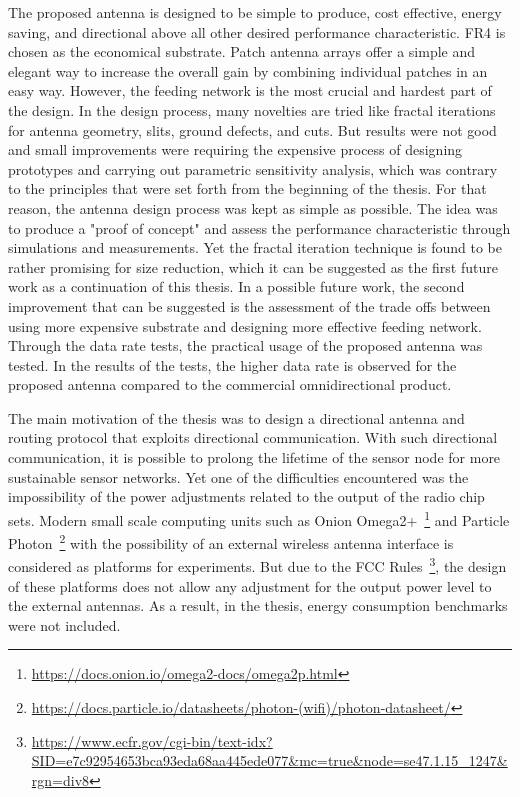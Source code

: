\documentclass[12pt, oneandhalf, chaparabic, sees, ms]{metu}
\begin{document}
The proposed antenna is designed to be simple to produce, cost effective, energy saving, and directional above all other desired performance characteristic.
FR4 is chosen as the economical substrate. Patch antenna arrays offer a simple and elegant way to increase the overall gain by combining individual
patches in an easy way. However, the feeding network is the most crucial and hardest part of the design. In the design process, many novelties are tried
like fractal iterations for antenna geometry, slits, ground defects, and cuts. But results were not good and small improvements were requiring the expensive process
of designing prototypes and carrying out parametric sensitivity analysis, which was contrary to the principles that were set forth from the beginning of the thesis.
For that reason, the antenna design process was kept as simple as possible. The idea was to produce a "proof of concept" and assess the performance characteristic
through simulations and measurements. Yet the fractal iteration technique is found to be rather promising for size reduction, which it can be suggested as the first
future work as a continuation of this thesis. In a possible future work, the second improvement that can be suggested is the assessment of the trade offs between
using more expensive substrate and designing more effective feeding network. Through the data rate tests, the practical usage of the proposed antenna was tested.
In the results of the tests, the higher data rate is observed for the proposed antenna compared to the commercial omnidirectional product.


The main motivation of the thesis was to design a directional antenna and routing protocol that exploits directional communication. 
With such directional communication, it is possible to prolong the lifetime of the sensor node for more sustainable sensor networks. 
Yet one of the difficulties encountered was the impossibility of the power adjustments related to the output of the radio chip sets.
Modern small scale computing units such as Onion Omega2+~\footnote{\protect\url{https://docs.onion.io/omega2-docs/omega2p.html}} 
and Particle Photon~\footnote{\protect\url{https://docs.particle.io/datasheets/photon-(wifi)/photon-datasheet/}} 
with the possibility of an external wireless antenna interface is considered
as platforms for experiments. 
But due to the FCC Rules~\footnote{\protect\url{https://www.ecfr.gov/cgi-bin/text-idx?SID=e7c92954653bca93eda68aa445ede077&mc=true&node=se47.1.15_1247&rgn=div8}}, 
the design of these platforms does not allow any adjustment for the output power level to the external 
antennas. As a result, in the thesis, energy consumption benchmarks were not included.
\end{document}

